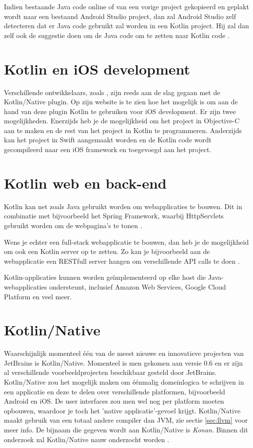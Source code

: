 Indien bestaande Java code online of van een vorige project gekopieerd en geplakt wordt naar een bestaand Android Studio project, dan zal Android Studio zelf detecteren dat er Java code gebruikt zal worden in een Kotlin project. Hij zal dan zelf ook de suggestie doen om de Java code om te zetten naar Kotlin code \autocite{Avantica2017}.

\section{Kotlin en iOS development}
Verschillende ontwikkelaars, zoals \textcite{GaoIOS}, zijn reeds aan de slag gegaan met de Kotlin/Native plugin. Op zijn website is te zien hoe het mogelijk is om aan de hand van deze plugin Kotlin te gebruiken voor iOS development. Er zijn twee mogelijkheden. Enerzijds heb je de mogelijkheid om het project in Objective-C aan te maken en de rest van het project in Kotlin te programmeren. Anderzijds kan het project in Swift aangemaakt worden en de Kotlin code wordt gecompileerd naar een iOS framework en toegevoegd aan het project.

\section{Kotlin web en back-end}
\label{sec:kotlincrossplatform}
Kotlin kan net zoals Java gebruikt worden om webapplicaties te bouwen. Dit in combinatie met bijvoorbeeld het Spring Framework, waarbij HttpServlets gebruikt worden om de webpagina's te tonen \autocite{JetBrainsWeb}.

Wens je echter een full-stack webapplicatie te bouwen, dan heb je de mogelijkheid om ook een Kotlin server op te zetten. Zo kan je bijvoorbeeld aan de webapplicatie een RESTfull server hangen om verschillende API calls te doen  \autocite{JetBrainsServer}.

Kotlin-applicaties kunnen worden geïmplementeerd op elke host die Java-webapplicaties ondersteunt, inclusief Amazon Web Services, Google Cloud Platform en veel meer.

\section{Kotlin/Native}
\label{sec:kotlinnative}
Waarschijnlijk momenteel één van de meest nieuwe en innovatieve projecten van JetBrains is Kotlin/Native. Momenteel is men gekomen aan versie 0.6 en er zijn al verschillende voorbeeldprojecten beschikbaar gesteld door JetBrains. Kotlin/Native zou het mogelijk maken om éénmalig domeinlogica te schrijven in een applicatie en deze te delen over verschillende platformen, bijvoorbeeld Android en iOS. De user interfaces zou men wel nog per platform moeten opbouwen, waardoor je toch het 'native applicatie'-gevoel krijgt. Kotlin/Native maakt gebruik van een totaal andere compiler dan JVM, zie sectie \ref{sec:llvm} voor meer info. De bijnaam die gegeven wordt aan Kotlin/Native is \textit{Konan}. Binnen dit onderzoek zal Kotlin/Native nauw onderzocht worden \autocite{AlbertGao}.

